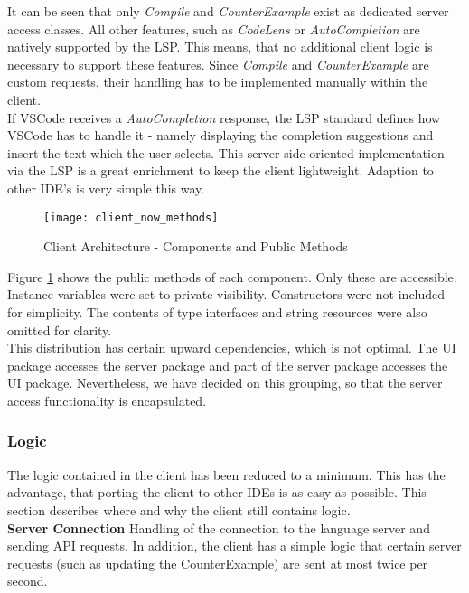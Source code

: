 It can be seen that only \textit{Compile} and \textit{CounterExample} exist as dedicated server access classes.
All other features, such as \textit{CodeLens} or \textit{AutoCompletion} are natively supported by the LSP.
This means, that no additional client logic is necessary to support these features.
Since \textit{Compile} and \textit{CounterExample} are custom requests,
their handling has to be implemented manually within the client.\\

If VSCode receives a \textit{AutoCompletion} response, the LSP standard defines how VSCode has to handle it -
namely displaying the completion suggestions and insert the text which the user selects.
This server-side-oriented implementation via the LSP is a great enrichment to keep the client lightweight.
Adaption to other IDE's is very simple this way.

\begin{figure}[H]
    \centering
    \texttt{[image: client\_now\_methods]}
    \caption{Client Architecture - Components and Public Methods}
    \label{fig:client_now_methods}
\end{figure}

Figure \ref{fig:client_now_methods} shows the public methods of each component.
Only these are accessible.
Instance variables were set to private visibility.
Constructors were not included for simplicity.
The contents of type interfaces and string resources were also omitted for clarity.\\

This distribution has certain upward dependencies, which is not optimal.
The UI package accesses the server package and part of the server package accesses the UI package.
Nevertheless, we have decided on this grouping,
so that the server access functionality is encapsulated.

\subsubsection{Logic}
The logic contained in the client has been reduced to a minimum.
This has the advantage, that porting the client to other IDEs is as easy as possible.
This section describes where and why the client still contains logic.\\

{\bf Server Connection} \textendash{}
Handling of the connection to the language server and sending API requests.
In addition, the client has a simple logic that certain server requests (such as updating the CounterExample)
are sent at most twice per second. \\

